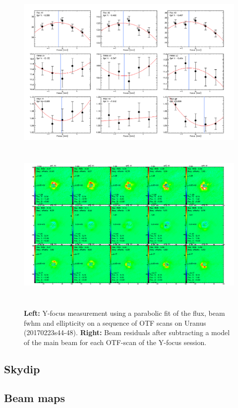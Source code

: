 \begin{figure}[h!]
\centering
\includegraphics[height=8cm]{Figures/plot_20170223s44.png}
\hspace{0.5cm}
\includegraphics[height=8cm]{Figures/residuals_focus_otf_20170223s44.png}
\caption{{\footnotesize \textbf{Left:} Y-focus measurement using a
    parabolic fit of the flux, beam fwhm and ellipticity on a sequence
    of OTF scans on Uranus (20170223s44-48). \textbf{Right:} Beam residuals after subtracting a model of the main beam for each OTF-scan of the Y-focus session.}}
\label{fig:Y_focus}
\end{figure}



\subsection{Skydip}




\subsection{Beam maps}

